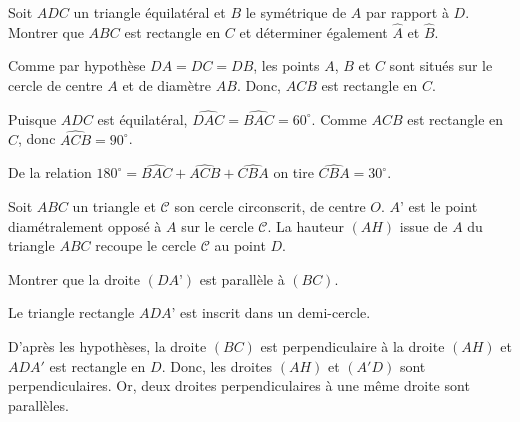 \begin{exo}
Soit $ADC$ un triangle équilatéral et $B$ le symétrique de $A$ par rapport à $D$. Montrer que $ABC$ est rectangle en $C$ et déterminer également $\widehat A$ et $\widehat B$.


\begin{sol} 
Comme par hypoth\`ese $DA = DC = DB$, les points $A$, $B$ et $C$ sont situ\'es sur le cercle de centre $A$ et de diam\`etre $AB$. Donc, $ACB$ est rectangle en $C$. 

Puisque $ADC$ est \'equilat\'eral, $\widehat{DAC} = \widehat{BAC}= 60^{\circ}$. Comme $ACB$ est rectangle en $C$, donc $\widehat{ACB}=90^{\circ}$.

De la relation $180^{\circ} = \widehat{BAC} + \widehat{ACB} + \widehat{CBA}$ on tire $\widehat{CBA} = 30^{\circ}$.    
\end{sol}  
\end{exo} 



\begin{exo}
Soit $ABC$ un triangle et $\mathcal C$ son cercle circonscrit, de centre $O$.
$A’$ est le point diamétralement opposé à $A$ sur le cercle $\mathcal C$.
La hauteur $(AH)$ issue de $A$ du triangle $ABC$ recoupe le cercle $\mathcal C$ au point $D$.

Montrer que la droite $(DA’)$ est parallèle à $(BC)$.

\begin{hint}   
Le triangle rectangle $ADA’$ est inscrit dans un demi-cercle. 
\end{hint}      
\begin{sol} 


D'après les hypothèses, la droite $(BC)$ est perpendiculaire \`a la droite $(AH)$ et $ADA'$ est rectangle en $D$. Donc, les droites $(AH)$ et $(A'D)$ sont perpendiculaires. Or, deux droites perpendiculaires à une même droite sont parallèles.  
\end{sol}  
\end{exo}  


